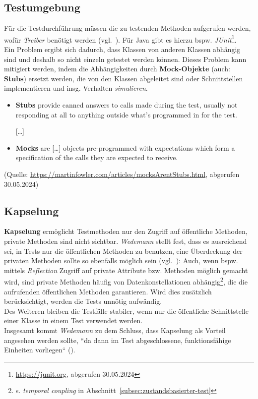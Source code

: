 \subsection*{Testumgebung}
Für die Testdurchführung müssen die zu testenden Methoden aufgerufen werden, wofür \textit{Treiber} benötigt werden (vgl.~\cite[55]{Wed09c}).
Für Java gibt es hierzu bspw. \textit{JUnit}\footnote{
\url{https://junit.org}, abgerufen 30.05.2024
}.\\
Ein Problem ergibt sich dadurch, dass Klassen von anderen Klassen abhängig sind und deshalb so nicht einzeln getestet werden können.
Dieses Problem kann mitigiert werden, indem die Abhängigkeiten durch \textbf{Mock-Objekte} (auch: \textbf{Stubs}) ersetzt werden, die von den Klassen abgeleitet sind oder Schnittstellen implementieren und insg. Verhalten \textit{simulieren}.\\

\begin{tcolorbox}[title=Unterschied Mock / Stub]
    \begin{itemize}
        \item \textbf{Stubs} provide canned answers to calls made during the test, usually not responding at all to anything outside what's programmed in for the test.
        \item[] [\ldots]
        \item \textbf{Mocks} are [\ldots] objects pre-programmed with expectations which form a specification of the calls they are expected to receive.
    \end{itemize}
    \noindent
    (Quelle: \url{https://martinfowler.com/articles/mocksArentStubs.html}, abgerufen 30.05.2024)
\end{tcolorbox}

\subsection*{Kapselung}
\textbf{Kapselung} ermöglicht Testmethoden nur den Zugriff auf öffentliche Methoden, private Methoden sind nicht sichtbar.
\textit{Wedemann} stellt fest, dass es ausreichend sei, in Tests nur die öffentlichen Methoden zu benutzen, eine Überdeckung der privaten Methoden sollte so ebenfalls möglich sein (vgl.~\cite[56]{Wed09c}): Auch, wenn bspw. mittels \textit{Reflection} Zugriff auf private Attribute bzw. Methoden möglich gemacht wird, sind private Methoden häufig von Datenkonstellationen abhängig\footnote{
s. \textit{temporal coupling} in Abschnitt~\ref{subsec:zustandsbasierter-test}
}, die die aufrufenden öffentlichen Methoden garantieren.
Wird dies zusätzlich berücksichtigt, werden die Tests unnötig aufwändig.\\
Des Weiteren bleiben die Testfälle stabiler, wenn nur die öffentliche Schnittstelle einer Klasse in einem Test verwendet werden.\\
Insgesamt kommt \textit{Wedemann} zu dem Schluss, dass Kapselung als Vorteil angesehen werden sollte, ``da dann im Test abgeschlossene, funktionsfähige Einheiten vorliegen`` (\cite[56]{Wed09c}).

